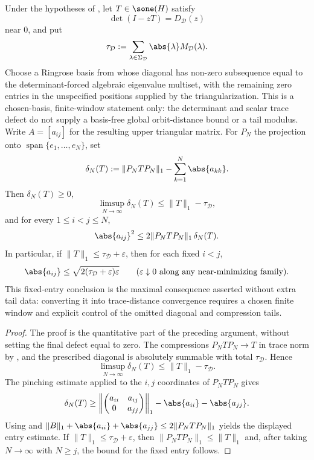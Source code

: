 \begin{corollary}
  \label{cor:schur-entry-stability}
  Under the hypotheses of
  , let \(T\in\sone(H)\)
  satisfy
  \[
    \det(I-zT)=D_{\mathcal D}(z)
  \]
  near \(0\), and put
  \[
    \tau_{\mathcal D}
    :=\sum_{\lambda\in\Sigma_{\mathcal D}}
      \abs{\lambda}M_{\mathcal D}(\lambda).
  \]
  Choose a Ringrose basis from
   whose diagonal has non-zero
  subsequence equal to the determinant-forced algebraic
  eigenvalue multiset, with the remaining zero entries in the unspecified
  positions supplied by the triangularization. This is a chosen-basis,
  finite-window statement only: the determinant and scalar trace defect do not
  supply a basis-free global orbit-distance bound or a tail modulus. Write
  \(A=[a_{ij}]\) for the resulting upper triangular matrix. For
  \(P_N\) the projection onto
  \(\operatorname{span}\{e_1,\ldots,e_N\}\), set
  \[
    \delta_N(T):=\|P_NTP_N\|_1-\sum_{k=1}^N\abs{a_{kk}}.
  \]
  Then \(\delta_N(T)\ge0\),
  \[
    \limsup_{N\to\infty}\delta_N(T)
    \le \|T\|_1-\tau_{\mathcal D},
  \]
  and for every \(1\le i<j\le N\),
  \[
    \abs{a_{ij}}^2
    \le 2\|P_NTP_N\|_1\,\delta_N(T).
  \]
  In particular, if \(\|T\|_1\le\tau_{\mathcal D}+\varepsilon\), then for
  each fixed \(i<j\),
  \[
    \abs{a_{ij}}
    \le \sqrt{2(\tau_{\mathcal D}+\varepsilon)\varepsilon}
    \qquad(\varepsilon\downarrow0 \text{ along any near-minimizing family}).
  \]
  This fixed-entry conclusion is the maximal consequence asserted without
  extra tail data: converting it into trace-distance convergence requires a
  chosen finite window and explicit control of the omitted diagonal and
  compression tails.
\end{corollary}

\begin{proof}
  The proof is the quantitative part of the preceding argument, without
  setting the final defect equal to zero. The compressions
  \(P_NTP_N\to T\) in trace norm by
  , and the prescribed diagonal
  is absolutely summable with total \(\tau_{\mathcal D}\). Hence
  \[
    \limsup_{N\to\infty}\delta_N(T)
    \le \|T\|_1-\tau_{\mathcal D}.
  \]
  The pinching estimate applied to the \(i,j\) coordinates of
  \(P_NTP_N\) gives
  \[
    \delta_N(T)
    \ge
    \left\|
      \begin{pmatrix}a_{ii}&a_{ij}\\0&a_{jj}\end{pmatrix}
    \right\|_1-\abs{a_{ii}}-\abs{a_{jj}}.
  \]
  Using  and
  \(\|B\|_1+\abs{a_{ii}}+\abs{a_{jj}}\le2\|P_NTP_N\|_1\) yields the
  displayed entry estimate. If
  \(\|T\|_1\le\tau_{\mathcal D}+\varepsilon\), then
  \(\|P_NTP_N\|_1\le\|T\|_1\) and, after taking \(N\to\infty\) with
  \(N\ge j\), the bound for the fixed entry follows.
\end{proof}

